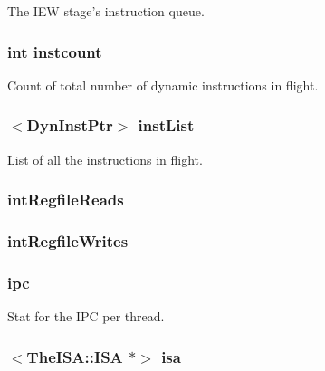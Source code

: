 \label{classFullO3CPU_a9429710408b27da398dc15a2eb80b9fc}
The IEW stage's instruction queue. \hypertarget{classFullO3CPU_a19e374b98940ff65bd4d9d17f198738c}{
\subsubsection[{instcount}]{\setlength{\rightskip}{0pt plus 5cm}int {\bf instcount}}}
\label{classFullO3CPU_a19e374b98940ff65bd4d9d17f198738c}
Count of total number of dynamic instructions in flight. \hypertarget{classFullO3CPU_ae10a391d02ce1ef67ee13cd82b7d46e5}{
\subsubsection[{instList}]{$<${\bf DynInstPtr}$>$ {\bf instList}}}
\label{classFullO3CPU_ae10a391d02ce1ef67ee13cd82b7d46e5}
List of all the instructions in flight. \hypertarget{classFullO3CPU_a46ee31ba135b8a26d7544abb48c242ef}{
\subsubsection[{intRegfileReads}]{ {\bf intRegfileReads}}}
\label{classFullO3CPU_a46ee31ba135b8a26d7544abb48c242ef}
\hypertarget{classFullO3CPU_a0539045bb3599b1c57886d55a19fa2d2}{
\subsubsection[{intRegfileWrites}]{ {\bf intRegfileWrites}}}
\label{classFullO3CPU_a0539045bb3599b1c57886d55a19fa2d2}
\hypertarget{classFullO3CPU_a6f168a31ee4084b6167d6761a4124014}{
\subsubsection[{ipc}]{ {\bf ipc}}}
\label{classFullO3CPU_a6f168a31ee4084b6167d6761a4124014}
Stat for the IPC per thread. \hypertarget{classFullO3CPU_aa0d8dc5e214b94342d1f730e4e34ae82}{
\subsubsection[{isa}]{$<$TheISA::ISA $\ast$$>$ {\bf isa}}}
\label{classFullO3CPU_aa0d8dc5e214b94342d1f730e4e34ae82}


